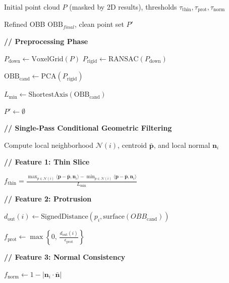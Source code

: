 \begin{algorithm}[t]
\caption{Pixel-to-3D Cross Consistency Conditional Filtering (PX3C)}
\label{alg:px3c}
\begin{algorithmic}[1]

\Require Initial point cloud $P$ (masked by 2D results), thresholds
$\tau_{\mathrm{\text{thin}}},\tau_{\mathrm{\text{prot}}},\tau_{\mathrm{norm}}$

\Ensure Refined OBB $\mathrm{OBB}_{final}$, clean point set $P'$

\State \textbf{// Preprocessing Phase}

\State $P_{\text{down}} \gets \mathrm{VoxelGrid}(P)$
\State $P_{\text{rigid}} \gets \mathrm{RANSAC}(P_{\text{down}})$

\State $\mathrm{OBB}_{\text{cand}} \gets \mathrm{PCA}(P_{\text{rigid}})$

\State $L_{\text{min}} \gets \mathrm{ShortestAxis}(\mathrm{OBB}_{\text{cand}})$

\State {}

\State $P' \gets \emptyset$

\State \textbf{// Single-Pass Conditional Geometric Filtering}


    \State Compute local neighborhood $\mathcal{N}(i)$,
           centroid $\bar{\boldsymbol p}$, and local normal $\boldsymbol n_i$

    \State \textbf{// Feature 1: Thin Slice}

    \State
    $f_{\text{thin}}=\frac{\max_{p\in\mathcal{N}(i)}\langle\boldsymbol{p}-\bar{\boldsymbol{p}},\boldsymbol{n}_i\rangle-
\min_{p\in\mathcal{N}(i)}\langle\boldsymbol{p}-\bar{\boldsymbol{p}},\boldsymbol{n}_i\rangle}{L_{\min}}$

    \State \textbf{// Feature 2: Protrusion}

    \State
    $d_{\text{out}}(i)
    \gets
    \mathrm{SignedDistance}
    \!\left(
    p_i,
    \mathrm{surface}(OBB_{\text{cand}})
    \right)$

    \State
    $f_{\text{prot}}
    \gets
    \max\!\left\{0,\,
    \frac{d_{\text{out}}(i)}{\epsilon_{\text{prot}}}
    \right\}$

    \State \textbf{// Feature 3: Normal Consistency}

    \State
    $f_{\text{norm}}
    \gets
    1-\left|\boldsymbol n_i\cdot\bar{\boldsymbol n}\right|$


\end{algorithmic}
\end{algorithm}
